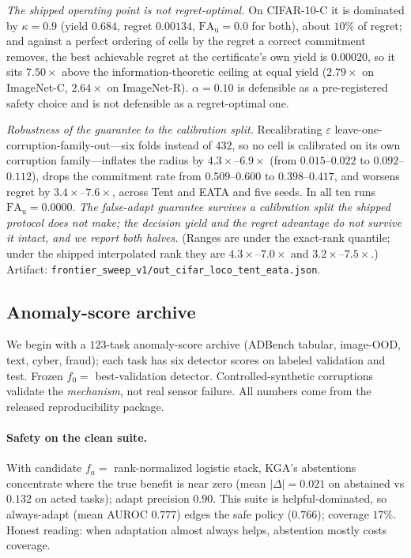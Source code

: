 \documentclass[conference]{IEEEtran}
\theoremstyle{plain}
\theoremstyle{definition}
\begin{document}
\emph{The shipped operating point is not regret-optimal.} On CIFAR-10-C it is dominated by
$\kappa=0.9$ (yield $0.684$, regret $0.00134$, $\mathrm{FA}_{\mathrm u}=0.0$ for both), about
$10\%$ of regret; and against a perfect ordering of cells by the regret a correct commitment
removes, the best achievable regret at the certificate's own yield is $0.00020$, so it sits
$7.50\times$ above the information-theoretic ceiling at equal yield ($2.79\times$ on ImageNet-C,
$2.64\times$ on ImageNet-R). $\alpha=0.10$ is defensible as a pre-registered safety choice and is
not defensible as a regret-optimal one.

\emph{Robustness of the guarantee to the calibration split.} Recalibrating $\varepsilon$
leave-one-corruption-family-out---six folds instead of $432$, so no cell is calibrated on its own
corruption family---inflates the radius by $4.3\times$--$6.9\times$ (from $0.015$--$0.022$ to
$0.092$--$0.112$), drops the commitment rate from $0.509$--$0.600$ to $0.398$--$0.417$, and worsens
regret by $3.4\times$--$7.6\times$, across Tent and EATA and five seeds. In all ten runs
$\mathrm{FA}_{\mathrm u}=0.0000$. \emph{The false-adapt guarantee survives a calibration split the
shipped protocol does not make; the decision yield and the regret advantage do not survive it
intact, and we report both halves.} (Ranges are under the exact-rank quantile; under the shipped
interpolated rank they are $4.3\times$--$7.0\times$ and $3.2\times$--$7.5\times$.) Artifact:
\texttt{frontier\_sweep\_v1/out\_cifar\_loco\_tent\_eata.json}.

\subsection{Anomaly-score archive}
We begin with a $123$-task anomaly-score archive (ADBench tabular, image-OOD, text, cyber,
fraud); each task has six detector scores on labeled validation and test. Frozen
$f_0=$ best-validation detector. Controlled-synthetic corruptions validate the
\emph{mechanism}, not real sensor failure. All numbers come from
the released reproducibility package.

\paragraph{Safety on the clean suite.} With candidate $f_a=$ rank-normalized logistic
stack, \textsc{KGA}'s abstentions concentrate where the true benefit is near zero
(mean $|\Delta|=0.021$ on abstained vs $0.132$ on acted tasks); adapt precision $0.90$.
This suite is helpful-dominated, so always-adapt (mean AUROC $0.777$) edges the safe
policy ($0.766$); coverage $17\%$. Honest reading: when adaptation almost always helps,
abstention mostly costs coverage.
\end{document}
